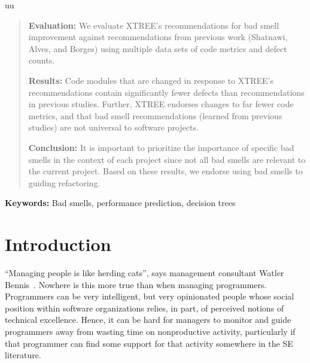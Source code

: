 uu \documentclass[final,twocolumn,5p]{elsarticle}
\theoremstyle{break}
\begin{document}
\begin{frontmatter}
\begin{abstract}
\noindent
{\bf Evaluation: } We evaluate XTREE's recommendations for bad smell improvement against recommendations from previous work (Shatnawi, Alves, and Borges) using multiple data sets of code metrics and defect counts.  

\noindent
{\bf Results: }Code modules that are changed in response to XTREE's recommendations contain significantly fewer defects than recommendations in previous studies. Further, XTREE endorses changes to far fewer code metrics, and that bad smell recommendations (learned from previous studies) are not universal to software projects.

\noindent
{\bf Conclusion: }It is important to  prioritize the importance of specific bad smells in the context of each project since not all bad smells are relevant to the current project. Based on these results, we endorse using bad smells to guiding refactoring. 

\end{abstract}
\end{frontmatter}

\vspace{1mm}
\noindent
{\bf Keywords:} Bad smells,
performance prediction,  decision trees 




\section{Introduction}

\noindent
``Managing people is like herding cats'', says management consultant Watler
Bennis~\cite{bennis97}. Nowhere is this more true than when managing programmers. 
Programmers can be very intelligent, but very opinionated people whose
social position within software organizations relies, in part,
of perceived notions of technical excellence. Hence, it can
be hard for managers to monitor and guide programmers away from wasting
time on nonproductive activity, particularly if that programmer can find
some support for that activity somewhere in the SE literature.
\end{document}
